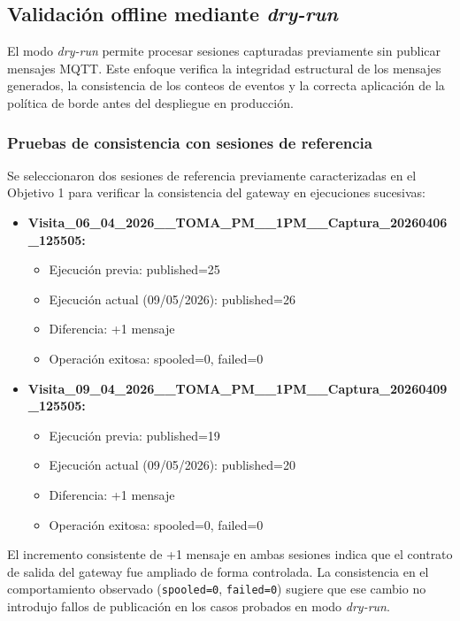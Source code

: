 \subsection{Validación offline mediante \textit{dry-run}}

El modo \textit{dry-run} permite procesar sesiones capturadas previamente sin publicar mensajes MQTT. Este enfoque verifica la integridad estructural de los mensajes generados, la consistencia de los conteos de eventos y la correcta aplicación de la política de borde antes del despliegue en producción.

\subsubsection{Pruebas de consistencia con sesiones de referencia}

Se seleccionaron dos sesiones de referencia previamente caracterizadas en el Objetivo 1 para verificar la consistencia del gateway en ejecuciones sucesivas:

\begin{itemize}
    \item \textbf{Visita\_06\_04\_2026\_\_TOMA\_PM\_\_1PM\_\_Captura\_20260406\_125505:}
    \begin{itemize}
        \item Ejecución previa: published=25
        \item Ejecución actual (09/05/2026): published=26
        \item Diferencia: +1 mensaje
        \item Operación exitosa: spooled=0, failed=0
    \end{itemize}
    
    \item \textbf{Visita\_09\_04\_2026\_\_TOMA\_PM\_\_1PM\_\_Captura\_20260409\_125505:}
    \begin{itemize}
        \item Ejecución previa: published=19
        \item Ejecución actual (09/05/2026): published=20
        \item Diferencia: +1 mensaje
        \item Operación exitosa: spooled=0, failed=0
    \end{itemize}
\end{itemize}

El incremento consistente de +1 mensaje en ambas sesiones indica que el contrato de salida del gateway fue ampliado de forma controlada. La consistencia en el comportamiento observado (\texttt{spooled=0}, \texttt{failed=0}) sugiere que ese cambio no introdujo fallos de publicación en los casos probados en modo \textit{dry-run}.

